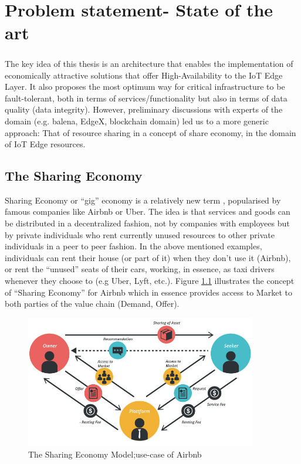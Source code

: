 \chapter{Problem statement- State of the art} \label{ch:problem-statement}

\paragraph{}
The key idea of this thesis is  an architecture that enables the implementation of economically attractive solutions that offer High-Availability to the IoT Edge Layer. It also proposes the most optimum way for critical infrastructure to be fault-tolerant, both in terms of services/functionality but also in terms of data quality (data integrity). However, preliminary discussions with experts of the domain (e.g. balena, EdgeX, blockchain domain)   led us to a more generic approach: That of resource sharing in a concept of share economy, in the domain of IoT Edge resources.

\section{The Sharing Economy}

Sharing Economy or “gig” economy is a relatively new term \cite{sharingeconomy},  popularised by famous companies like Airbnb or Uber. The idea is that services and goods can be distributed in a decentralized fashion, not by companies with employees but by private individuals who rent currently unused resources to other private individuals in a peer to peer fashion. In the above mentioned examples, individuals can rent their house (or part of it) when they don’t use it (Airbnb), or rent the “unused” seats of their cars, working, in essence, as taxi drivers whenever they choose to (e.g Uber, Lyft, etc.). Figure \ref{fig:sharing_economy} illustrates the concept of “Sharing Economy” for Airbnb which in essence provides access to Market to both parties of the value chain (Demand, Offer).

\begin{figure}[h]
    \centering
    \includegraphics[width=0.9\textwidth]{images/sharingEconomy.jpg}
    \caption{The Sharing Economy Model;use-case of Airbnb\cite{airbnb}}
    \label{fig:sharing_economy}
\end{figure}

